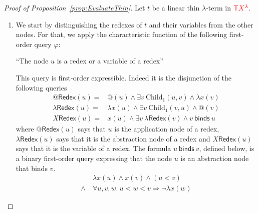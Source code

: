 \begin{proof}[Proof of Proposition~\ref{prop:EvaluateThin}] Let $t$ be a linear thin $\lambda$-term in ${\color{red}{\mathsf T}} {\color{red}{{X}^{{\color{red}{\lambda}}}}}$.




\begin{enumerate}
\item
We start by distinguishing the redexes of $t$ and their variables from the other nodes. For that, we apply the characteristic function of the following first-order query $\varphi$:
    \begin{center}
    ``The node $u$ is a redex or a variable of a redex''
    \end{center}
    This query is first-order expressible. Indeed it is the disjunction of the following queries
$$\begin{array}{rl}
@\mathsf{Redex}(u) = & @(u) \wedge \exists v \ \mathrm{Child}_1(u,v) \wedge \lambda x(v)\\[8pt]
\lambda\mathsf{Redex}(u)=& \lambda x(u) \wedge \exists v \ \mathrm{Child}_1(v,u) \wedge @(v) \\[8pt]
X\mathsf{Redex}(u) = & x(u) \wedge \exists v\ \lambda\mathsf{Redex}(v) \wedge v\ \mathsf{binds}\ u
\end{array}$$
where $@\mathsf{Redex}(u)$ says that $u$ is the application node of a redex, $\lambda\mathsf{Redex}(u)$ says that it is the abstraction node of a redex and $X\mathsf{Redex}(u)$ says that it is the variable of a redex. 
The formula $u\ \mathsf{binds}\ v$, defined below,  is a binary first-order query expressing that the node $u$ is an abstraction node that binds $v$.
 \begin{align*}
 &\lambda x(u) \wedge x(v) \wedge(u<v)\ \\
 \wedge \ & \forall u,v,w.\ u<w<v\Rightarrow \neg \lambda x(w)
 \end{align*}


\end{enumerate}
\end{proof}
